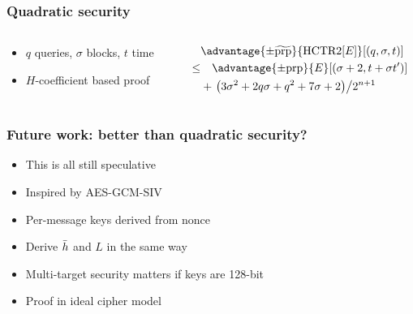 \documentclass[aspectratio=169]{beamer}
\begin{document}
\begin{frame}

    \frametitle{Quadratic security}

    \begin{columns}
        \begin{column}{.4\textwidth}
            \begin{itemize}
                \item \(q\) queries, \(\sigma\) blocks, \(t\) time
                \item \(H\)-coefficient based proof
            \end{itemize}
                \end{column}
        \begin{column}{.6\textwidth}
            \begin{align*}
                &\advantage{\pm \widetilde{\mathrm{prp}}}{\HCTR[E]}[(q, \sigma, t)] \\
                \leq & \quad \advantage{\pm \mathrm{prp}}{E}[(\sigma + 2, t + \sigma t')] \\
                &+ \left.\left(3\sigma^2 + 2q\sigma + q^2 + 7\sigma + 2\right)\middle/2^{n+1}\right.
            \end{align*}
                \end{column}
    \end{columns}
\end{frame}
    
\begin{frame}
\frametitle{Future work: better than quadratic security?}

\begin{itemize}
    \item This is all still speculative
    \item Inspired by AES-GCM-SIV
    \item Per-message keys derived from nonce
    \item Derive \(\bar{h}\) and \(L\) in the same way
    \item Multi-target security matters if keys are 128-bit
    \item Proof in ideal cipher model
\end{itemize}
\end{frame}
\end{document}

